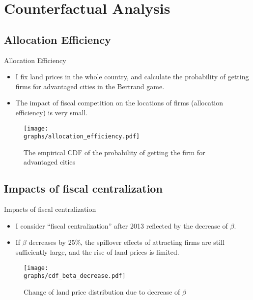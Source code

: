 \documentclass[xcolor={dvipsnames}]{beamer}
\theoremstyle{plain}
\newcommand{\graphs}{../../Graphs}
\begin{document}
\section{Counterfactual Analysis}
\subsection{Allocation Efficiency}
\begin{frame}{Allocation Efficiency}
    \begin{itemize}
        \item I fix land prices in the whole country,
              and calculate the probability of getting firms for advantaged cities in
              the Bertrand game.
        \item  The impact
              of fiscal competition on the locations of firms (allocation efficiency)
              is very small.
    \end{itemize}
    \begin{figure}[H]
        \centering
        \caption*{The empirical CDF of the probability of getting the firm for advantaged cities}
        \texttt{[image: \\graphs/allocation\_efficiency.pdf]}
    \end{figure}
\end{frame}


\subsection{Impacts of fiscal centralization}
\begin{frame}{Impacts of fiscal centralization}
    \begin{itemize}
        \item I consider “fiscal centralization” after 2013 reflected by the decrease of $\beta$.
        \item If $\beta$ decreases by 25\%, the spillover effects of
              attracting firms are still sufficiently large, and the rise of land prices is limited.
    \end{itemize}
    \begin{figure}[H]
        \centering
        \caption*{Change of land price distribution due to decrease of $\beta$}
        \texttt{[image: \\graphs/cdf\_beta\_decrease.pdf]}
    \end{figure}
\end{frame}
\end{document}
